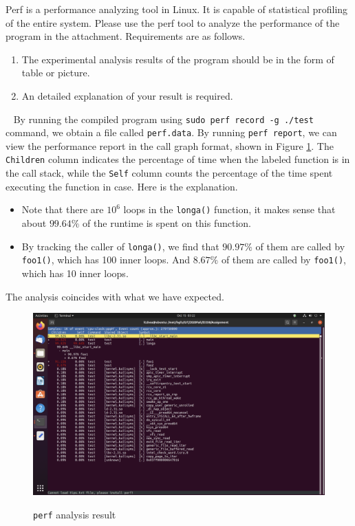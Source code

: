 \begin{exercise}[]{Perf is a performance analyzing tool in Linux. It is capable of statistical profiling of the entire system. Please use the perf tool to analyze the performance of the program in the attachment. Requirements are as follows.
    \begin{enumerate}
        \item The experimental analysis results of the program should be in the form of table or picture.  
        \item An detailed explanation of your result is required.
    \end{enumerate}}
  \begin{solution}
  \par{~}
  By running the compiled program using \texttt{sudo perf record -g ./test} command, we obtain a file called \texttt{perf.data}. By running \texttt{perf report}, we can view the performance report in the call graph format, shown in Figure \ref{fig:perf}. The \texttt{Children} column indicates the percentage of time when the labeled function is in the call stack, while the \texttt{Self} column counts the percentage of the time spent executing the function in case. Here is the explanation.
  \begin{itemize}
    \item Note that there are $10^6$ loops in the \texttt{longa()} function, it makes sense that about $99.64\%$ of the runtime is spent on this function.
    \item By tracking the caller of \texttt{longa()}, we find that $90.97\%$ of them are called by \texttt{foo1()}, which has 100 inner loops. And $8.67\%$ of them are called by \texttt{foo1()}, which has 10 inner loops.
  \end{itemize}
  
  The analysis coincides with what we have expected.

  \begin{figure}
    \centering
    \includegraphics[width=14cm]{perf.png}
    \label{fig:perf}
    \caption{\texttt{perf} analysis result}
  \end{figure}
  \end{solution}
  \label{ex4}
\end{exercise}


